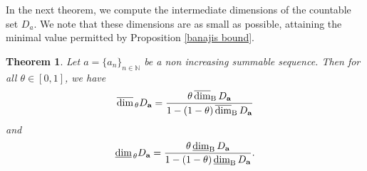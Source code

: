 \documentclass[11pt,reqno,bookmarksnumbered,raiselinks,breaklinks,colorlinks,plainpages]{amsart}
\newcommand\ubd{\overline{\mbox{\rm dim}}_{\rm B}\,} %
\newcommand\lbd{\underline{\mbox{\rm dim}}_{\rm B}\,} %
\newcommand\da{\underline{\mbox{\rm dim}}_{\,\theta}} %
\newcommand\uda{\overline{\mbox{\rm dim}}_{\,\theta}} %
\newtheorem{theo}{Theorem}[section]
\begin{document}
In the next theorem, we compute the intermediate dimensions of the countable set $D_a$. 
We note that these dimensions are as small as possible, attaining the minimal value 
permitted by Proposition \ref{banajis bound}.

\begin{theo}\label{dimension de suceciones} 
Let \(a=\{a_n\}_{n\in\mathbb{N}}\) be a non increasing summable sequence. Then for all \(\theta\in [0,1]\), we have
\begin{equation}\label{Theo inciso 11}
\uda D_{\textbf{a}} = \frac{\theta \, \ubd D_{\textbf{a}} }{1 - (1-\theta)\, \ubd D_{\textbf{a}}}
\end{equation}
and  
\[
\da D_{\textbf{a}} = \frac{\theta \, \lbd D_{\textbf{a}} }{1 - (1-\theta)\, \lbd D_{\textbf{a}} }.
\]
\end{theo}
\end{document}
